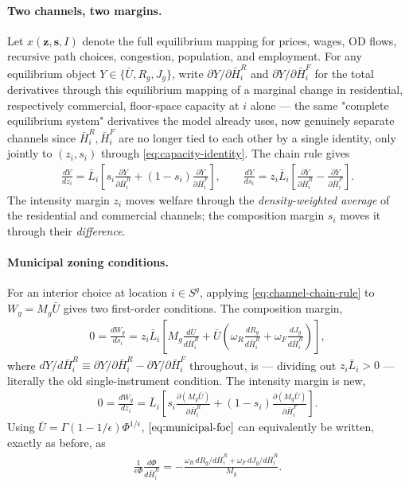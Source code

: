 \documentclass[12pt, a4paper]{article}
\theoremstyle{definition}
\theoremstyle{remark}
\begin{document}
\paragraph{Two channels, two margins.}
Let $x(\mathbf z,\mathbf s,I)$ denote the full equilibrium mapping for prices, wages, OD flows, recursive path choices, congestion, population, and employment. For any equilibrium object $Y\in\{\bar U,R_g,J_g\}$, write $\partial Y/\partial\bar H_i^R$ and $\partial Y/\partial\bar H_i^F$ for the total derivatives through this equilibrium mapping of a marginal change in residential, respectively commercial, floor-space capacity at $i$ alone — the same "complete equilibrium system" derivatives the model already uses, now genuinely separate channels since $\bar H_i^R,\bar H_i^F$ are no longer tied to each other by a single identity, only jointly to $(z_i,s_i)$ through \eqref{eq:capacity-identity}. The chain rule gives
\begin{align}
    \label{eq:channel-chain-rule}
    \frac{dY}{dz_i}
    =
    \bar L_i\left[s_i\frac{\partial Y}{\partial\bar H_i^R}+(1-s_i)\frac{\partial Y}{\partial\bar H_i^F}\right],
    \qquad
    \frac{dY}{ds_i}
    =
    z_i\bar L_i\left[\frac{\partial Y}{\partial\bar H_i^R}-\frac{\partial Y}{\partial\bar H_i^F}\right].
\end{align}
The intensity margin $z_i$ moves welfare through the \emph{density-weighted average} of the residential and commercial channels; the composition margin $s_i$ moves it through their \emph{difference}.
\paragraph{Municipal zoning conditions.}
For an interior choice at location $i\in S^g$, applying \eqref{eq:channel-chain-rule} to $W_g=M_g\bar U$ gives two first-order conditions. The composition margin,
\begin{align}
    0
    =
    \frac{dW_g}{ds_i}
    =
    z_i\bar L_i
    \left[
    M_g\frac{d\bar U}{d\bar H_i^R}
    +
    \bar U
    \left(
    \omega_R\frac{dR_g}{d\bar H_i^R}
    +
    \omega_F\frac{dJ_g}{d\bar H_i^R}
    \right)
    \right],
    \label{eq:municipal-foc}
\end{align}
where $dY/d\bar H_i^R\equiv\partial Y/\partial\bar H_i^R-\partial Y/\partial\bar H_i^F$ throughout, is — dividing out $z_i\bar L_i>0$ — literally the old single-instrument condition. The intensity margin is new,
\begin{align}
    0
    =
    \frac{dW_g}{dz_i}
    =
    \bar L_i
    \left[
    s_i\frac{\partial(M_g\bar U)}{\partial\bar H_i^R}
    +
    (1-s_i)\frac{\partial(M_g\bar U)}{\partial\bar H_i^F}
    \right].
    \label{eq:municipal-foc-z}
\end{align}
Using $\bar U=\Gamma(1-1/\epsilon)\Phi^{1/\epsilon}$, $\eqref{eq:municipal-foc}$ can equivalently be written, exactly as before, as
\begin{align}
    \label{eq:municipal-foc-phi}
    \frac{1}{\epsilon\Phi}\frac{d\Phi}{d\bar H_i^R}
    =
    -
    \frac{
    \omega_R\,dR_g/d\bar H_i^R
    +
    \omega_F\,dJ_g/d\bar H_i^R
    }{M_g}.
\end{align}
\end{document}

